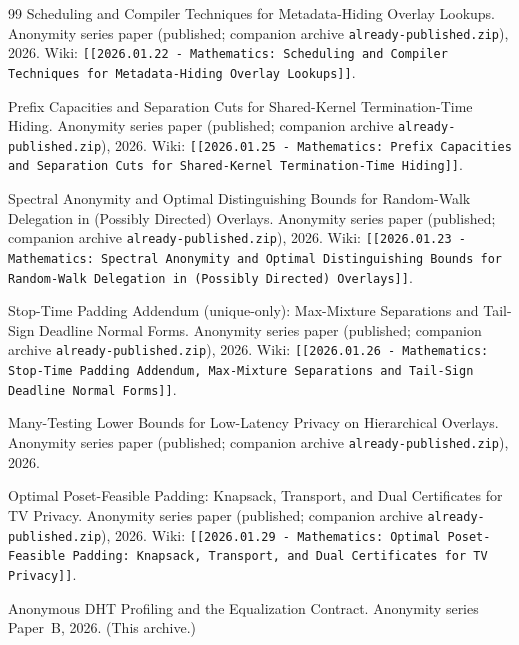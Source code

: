 \documentclass[11pt]{article}
\theoremstyle{definition}
\theoremstyle{remark}
\begin{document}
\begin{thebibliography}{99}
Scheduling and Compiler Techniques for Metadata-Hiding Overlay Lookups.
\newblock Anonymity series paper (published; companion archive \texttt{already-published.zip}), 2026.
\newblock Wiki: \texttt{[[2026.01.22 - Mathematics: Scheduling and Compiler Techniques for Metadata-Hiding Overlay Lookups]]}.

Prefix Capacities and Separation Cuts for Shared-Kernel Termination-Time Hiding.
\newblock Anonymity series paper (published; companion archive \texttt{already-published.zip}), 2026.
\newblock Wiki: \texttt{[[2026.01.25 - Mathematics: Prefix Capacities and Separation Cuts for Shared-Kernel Termination-Time Hiding]]}.

Spectral Anonymity and Optimal Distinguishing Bounds for Random-Walk Delegation in (Possibly Directed) Overlays.
\newblock Anonymity series paper (published; companion archive \texttt{already-published.zip}), 2026.
\newblock Wiki: \texttt{[[2026.01.23 - Mathematics: Spectral Anonymity and Optimal Distinguishing Bounds for Random-Walk Delegation in (Possibly Directed) Overlays]]}.

Stop-Time Padding Addendum (unique-only): Max-Mixture Separations and Tail-Sign Deadline Normal Forms.
\newblock Anonymity series paper (published; companion archive \texttt{already-published.zip}), 2026.
\newblock Wiki: \texttt{[[2026.01.26 - Mathematics: Stop-Time Padding Addendum, Max-Mixture Separations and Tail-Sign Deadline Normal Forms]]}.

Many-Testing Lower Bounds for Low-Latency Privacy on Hierarchical Overlays.
\newblock Anonymity series paper (published; companion archive \texttt{already-published.zip}), 2026.

Optimal Poset-Feasible Padding: Knapsack, Transport, and Dual Certificates for TV Privacy.
\newblock Anonymity series paper (published; companion archive \texttt{already-published.zip}), 2026.
\newblock Wiki: \texttt{[[2026.01.29 - Mathematics: Optimal Poset-Feasible Padding: Knapsack, Transport, and Dual Certificates for TV Privacy]]}.

Anonymous DHT Profiling and the Equalization Contract.
\newblock Anonymity series Paper~B, 2026. (This archive.)


\end{thebibliography}
\end{document}
